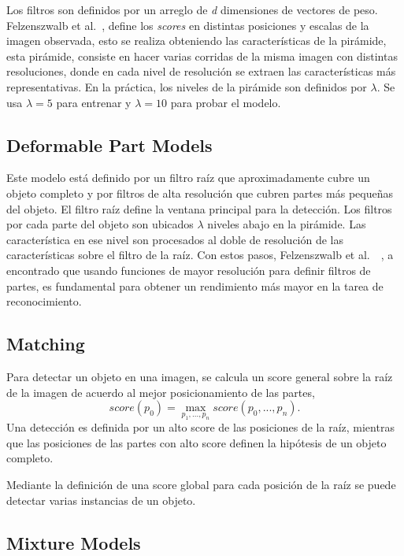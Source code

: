 Los filtros son definidos por un arreglo de \textit{d} dimensiones de vectores de peso. Felzenszwalb et al.~\cite{Felzenszwalb2010}, define los \textit{scores} en distintas posiciones y escalas de la imagen observada, esto se realiza obteniendo las características de la pirámide, esta pirámide, consiste en hacer varias corridas de la misma imagen con distintas resoluciones, donde en cada nivel de resolución se extraen las características más representativas. En la práctica, los niveles de la pirámide son definidos por $\lambda$. Se usa $\lambda = 5$ para entrenar y $\lambda = 10$ para probar el modelo.

\subsection{Deformable Part Models}\label{subsec:dpm}
Este modelo está definido por un filtro raíz que aproximadamente cubre un objeto completo y por filtros de alta resolución que cubren partes más pequeñas del objeto. El filtro raíz define la ventana principal para la detección. Los filtros por cada parte del objeto son ubicados $\lambda$ niveles abajo en la pirámide. Las característica en ese nivel son procesados al doble de resolución de las características sobre el filtro de la raíz.
Con estos pasos, Felzenszwalb et al.~\cite{Felzenszwalb2010}~\cite{Felzenszwalb2013}, a encontrado que usando funciones de mayor resolución para definir filtros de partes, es fundamental para obtener un rendimiento más mayor en la tarea de reconocimiento.

\subsection{Matching}\label{subsec:matching}
Para detectar un objeto en una imagen, se calcula un score general sobre la raíz de la imagen de acuerdo al mejor posicionamiento de las partes, 
\begin{equation}
	score(p_{0}) = \max_{p_{1}, ..., p_{n}} score(p_{0}, ..., p_{n}).
\end{equation} 
Una detección es definida por un alto score de las posiciones de la raíz, mientras que las posiciones de las partes con alto score definen la hipótesis de un objeto completo.

Mediante la definición de una score global para cada posición de la raíz se puede detectar varias instancias de un objeto.

\subsection{Mixture Models}\label{subsec:mm}